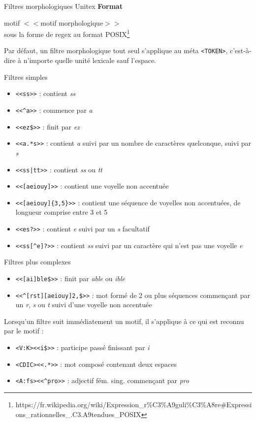 \documentclass[xetex,xcolor={table,usenames,dvipsnames}]{beamer}
\newcommand{\bolder}[1]{{\color{purple}\bfseries#1}}
\begin{document}
\begin{frame}{Filtres morphologiques Unitex}
	\bolder{Format}
	
	motif $<<$motif morphologique$>>$\\
	sous la forme de regex au format \textsc{POSIX}\footnote{https://fr.wikipedia.org/wiki/Expression\_r\%C3\%A9guli\%C3\%A8re\#Expressions\_rationnelles\_.C3.A9tendues\_POSIX}
	
	Par défaut, un filtre morphologique tout seul s’applique au méta
	\texttt{<TOKEN>}, c’est-à-dire à n’importe quelle unité lexicale sauf l’espace.
\end{frame}

\begin{frame}{Filtres simples}
	\begin{itemize}
		\item \texttt{<<ss>>} : contient \textit{ss}
		\item \texttt{<<\^{}a>>} : commence par \textit{a}
		\item \texttt{<<ez\${}>>} : finit par \textit{ez}
		\item \texttt{<<a.*s>>} : contient \textit{a} suivi par un nombre de caractères quelconque, suivi par \textit{s}
		\item \texttt{<<ss|tt>>} : contient \textit{ss} ou \textit{tt}
		\item \texttt{<<[aeiouy]>>} : contient une voyelle non accentuée
		\item \texttt{<<[aeiouy]\{3,5\}>>} : contient une séquence de voyelles non accentuées, de longueur comprise entre 3 et 5
		\item \texttt{<<es?>>} : contient \textit{e} suivi par un \textit{s} facultatif
		\item \texttt{<<ss[\^{}e]?>>} : contient \textit{ss} suivi par un caractère qui n'est pas une voyelle \textit{e}
	\end{itemize}
\end{frame}

\begin{frame}{Filtres plus complexes}
	\begin{itemize}
		\item \texttt{<<[ai]ble\${}>>} : finit par \textit{able} ou \textit{ible}
		\item \texttt{<<\^{}[rst][aeiouy]{2,}\${}>>} : mot formé de 2 ou plus séquences commençant par un \textit{r}, \textit{s} ou \textit{t} suivi d'une voyelle non accentuée
	\end{itemize}
	
	Lorsqu'un filtre suit immédiatement un motif, il s'applique à ce qui est reconnu par le motif :
	\begin{itemize}
		\item \texttt{<V:K><<i\${}>>} : participe passé finissant par \textit{i}
		\item \texttt{<CDIC><<.*>>} : mot composé contenant deux espaces
		\item \texttt{<A:fs><<\^{}pro>>} : adjectif fém. sing. commençant par \textit{pro}
	\end{itemize}
\end{frame}
\end{document}
